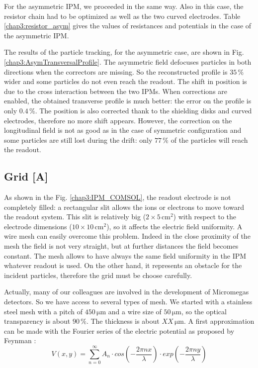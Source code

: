 \begin{refsection}
  For the asymmetric IPM, we proceeded in the same way. Also in this case, the resistor chain had to be optimized as well as the two curved electrodes. Table \ref{chap3:resistor_asym} gives the values of resistances and potentials in the case of the asymmetric IPM.

  

  The results of the particle tracking, for the asymmetric case, are shown in Fig. \ref{chap3:AsymTransversalProfile}. The asymmetric field defocuses particles in both directions when the correctors are missing. So the reconstructed profile is $35\,\mathrm{\%}$ wider and some particles do not even reach the readout. The shift in position is due to the cross interaction between the two IPMs. When corrections are enabled, the obtained transverse profile is much better: the error on the profile is only $0.4\,\mathrm{\%}$. The position is also corrected thank to the shielding disks and curved electrodes, therefore no more shift appears. However, the correction on the longitudinal field is not as good as in the case of symmetric configuration and some particles are still lost during the drift: only $77\,\mathrm{\%}$ of the particles will reach the readout.

  

  \subsection{Grid [A]}
  \label{chap3:sec:grid}
  As shown in the Fig. \ref{chap3:IPM_COMSOL}, the readout electrode is not completely filled: a rectangular slit allows the ions or electrons to move toward the readout system. This slit is relatively big ($2\times5\,\mathrm{cm^{2}}$) with respect to the electrode dimensions ($10\times10\,\mathrm{cm^{2}}$), so it affects the electric field uniformity. A wire mesh can easily overcome this problem. Indeed in the close proximity of the mesh the field is not very straight, but at further distances the field becomes constant. The mesh allows to have always the same field uniformity in the IPM whatever readout is used. On the other hand, it represents an obstacle for the incident particles, therefore the grid must be choose carefully.

  Actually, many of our colleagues are involved in the development of Micromegas detectors. So we have access to several types of mesh. We started with a stainless steel mesh with a pitch of $450\,\mathrm{\mu m}$ and a wire size of $50\,\mathrm{\mu m}$, so the optical transparency is about $90\,\mathrm{\%}$. The thickness is about $XX\,\mathrm{\mu m}$. A first approximation can be made with the Fourier series of the electric potential as proposed by Feynman \cite{feynman2011feynman}:
  \begin{equation}
    V(x,y)= \sum^{\infty}_{n=0} A_{n} \cdot cos(-\frac{2\pi n x}{\lambda}) \cdot exp(-\frac{2\pi n y}{\lambda})
  \end{equation}


\end{refsection}
